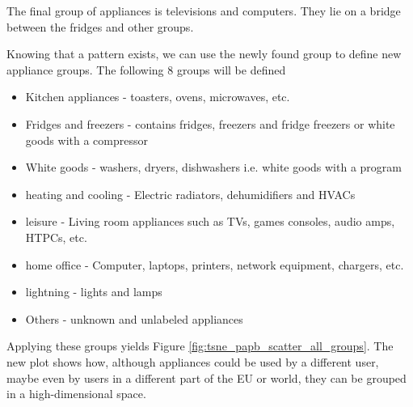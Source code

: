 The final group of appliances is televisions and computers. They lie 
on a bridge between the fridges and other groups. 



Knowing that a pattern exists, we can use the newly found group to define new appliance groups.
The following 8 groups will be defined
\begin{itemize}
    \item Kitchen appliances - toasters, ovens, microwaves, etc.
    \item Fridges and freezers  - contains fridges, freezers and fridge freezers or white goods with a compressor
    \item White goods - washers, dryers, dishwashers i.e. white goods with a program
    \item heating and cooling - Electric radiators, dehumidifiers and HVACs
    \item leisure -  Living room appliances such as TVs, games consoles, audio amps, HTPCs, etc.
    \item home office - Computer, laptops, printers, network equipment, chargers, etc.
    \item lightning - lights and lamps
    \item Others - unknown and unlabeled appliances
\end{itemize}

Applying these groups yields Figure \ref{fig:tsne_papb_scatter_all_groups}.
The new plot shows how, although appliances could be used by a different
user, maybe even by users in a different part of the EU or world,
they can be grouped in a high-dimensional space. 

